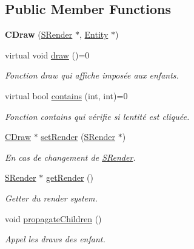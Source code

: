 \subsection*{Public Member Functions}
\begin{DoxyCompactItemize}
\item 
\hypertarget{class_c_draw_a8750d7c0403a62a0d299d6918233f77c}{}{\bfseries C\+Draw} (\hyperlink{class_s_render}{S\+Render} $\ast$, \hyperlink{class_entity}{Entity} $\ast$)\label{class_c_draw_a8750d7c0403a62a0d299d6918233f77c}

\item 
\hypertarget{class_c_draw_a1f9a4496073715710ae32ed198dae9ab}{}virtual void \hyperlink{class_c_draw_a1f9a4496073715710ae32ed198dae9ab}{draw} ()=0\label{class_c_draw_a1f9a4496073715710ae32ed198dae9ab}

\begin{DoxyCompactList}\small\item\em Fonction draw qui affiche imposée aux enfants. \end{DoxyCompactList}\item 
\hypertarget{class_c_draw_a12c33a831c5a484f4173fbc385e63d72}{}virtual bool \hyperlink{class_c_draw_a12c33a831c5a484f4173fbc385e63d72}{contains} (int, int)=0\label{class_c_draw_a12c33a831c5a484f4173fbc385e63d72}

\begin{DoxyCompactList}\small\item\em Fonction contains qui vérifie si l\textquotesingle{}entité est cliquée. \end{DoxyCompactList}\item 
\hyperlink{class_c_draw}{C\+Draw} $\ast$ \hyperlink{class_c_draw_adc108c63255cf24a18bac9efbd709e8d}{set\+Render} (\hyperlink{class_s_render}{S\+Render} $\ast$)
\begin{DoxyCompactList}\small\item\em En cas de changement de \hyperlink{class_s_render}{S\+Render}. \end{DoxyCompactList}\item 
\hyperlink{class_s_render}{S\+Render} $\ast$ \hyperlink{class_c_draw_a8785e6f252fc6ba0dcf0e1f6faafa06d}{get\+Render} ()
\begin{DoxyCompactList}\small\item\em Getter du render system. \end{DoxyCompactList}\item 
\hypertarget{class_c_draw_a7db62f4578316163367d26a663630ad8}{}void \hyperlink{class_c_draw_a7db62f4578316163367d26a663630ad8}{propagate\+Children} ()\label{class_c_draw_a7db62f4578316163367d26a663630ad8}

\begin{DoxyCompactList}\small\item\em Appel les draws des enfant. \end{DoxyCompactList}\end{DoxyCompactItemize}
